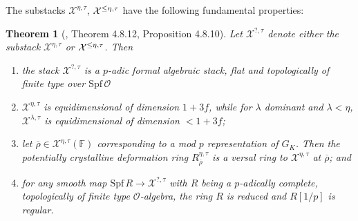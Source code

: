 \documentclass[oneside,a4paper,english, 11pt]{amsart}
\theoremstyle{plain}
\newtheorem{thm}{Theorem}[subsection]
\theoremstyle{plain}
\theoremstyle{plain}
\theoremstyle{plain}
\theoremstyle{plain}
\theoremstyle{plain}
\theoremstyle{definition}
\theoremstyle{definition}
\theoremstyle{definition}
\theoremstyle{remark}
\numberwithin{equation}{section}
\newcommand{\bF}{\mathbb{F}}
\newcommand{\cO}{\mathcal{O}}
\newcommand{\cX}{\mathcal{X}}
\newcommand{\rhobar}{\overline{\rho}}
\newcommand{\Spf}{\mathrm{Spf}}
\DeclareMathOperator{\leqeta}{\text{$\setlength{\thickmuskip}{0mu}\leq\eta$}}
\newcommand{\ra}{\rightarrow}
\begin{document}
The substacks $\cX^{\eta,\tau}$, $\cX^{\leqeta,\tau}$ have the following fundamental properties:
\begin{thm}[\cite{EGstack}, Theorem 4.8.12, Proposition 4.8.10]
\label{thm:EG_basic_properties}
Let $\cX^{?,\tau}$ denote either the substack $\cX^{\eta,\tau}$ or $\cX^{\leqeta,\tau}$.
Then
\begin{enumerate}
\item the stack $\cX^{?,\tau}$ is a $p$-adic formal algebraic stack, flat and topologically of finite type over $\Spf\, \cO$ %
\item $\cX^{\eta,\tau}$ is equidimensional of dimension $1+3f$, while for $\lambda$ dominant and $\lambda< \eta$, $\cX^{\lambda,\tau}$ is equidimensional of dimension $<1+3f$; 
\item let $\rhobar \in \cX^{\eta,\tau}(\bF)$ corresponding to a mod $p$ representation of $G_K$. 
Then the potentially crystalline deformation ring $R_{\rhobar}^{\eta,\tau}$ is a versal ring to $\cX^{\eta,\tau}$ at $\rhobar$; and
\item for any smooth map $\Spf\, R\ra \cX^{?,\tau}$ with $R$ being a $p$-adically complete, topologically of finite type $\cO$-algebra, the ring $R$ is reduced and $R[1/p]$ is regular.
\end{enumerate}
\end{thm}
%
\end{document}
